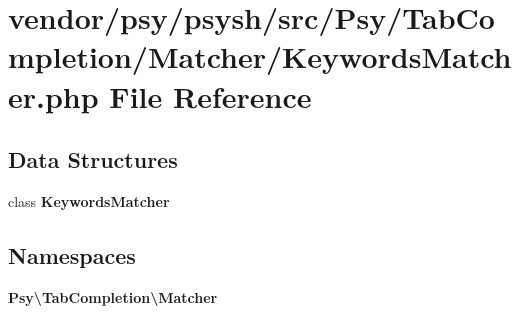 \section{vendor/psy/psysh/src/\+Psy/\+Tab\+Completion/\+Matcher/\+Keywords\+Matcher.php File Reference}
\label{_keywords_matcher_8php}
\subsection*{Data Structures}
\begin{DoxyCompactItemize}
\item 
class {\bf Keywords\+Matcher}
\end{DoxyCompactItemize}
\subsection*{Namespaces}
\begin{DoxyCompactItemize}
\item 
 {\bf Psy\textbackslash{}\+Tab\+Completion\textbackslash{}\+Matcher}
\end{DoxyCompactItemize}
